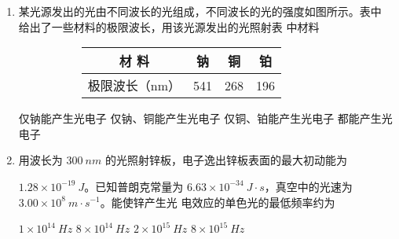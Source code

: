 \begin{enumerate}
\item 
{}
某光源发出的光由不同波长的光组成，不同波长的光的强度如图所示。表中
给出了一些材料的极限波长，用该光源发出的光照射表
中材料  
\begin{figure}[h!]
	\centering
\begin{subfigure}{0.4\linewidth}
	\centering
	 
	\caption{}\label{}
\end{subfigure}
\begin{subfigure}{0.4\linewidth}
	\centering
 \begin{tabular}{|c|c|c|c|}
	\hline 
	材  料 & 钠 & 铜 & 铂
 \\
	\hline
	极限波长（nm） & 541 & 268 & 196\\ 
	\hline 
\end{tabular}
	\caption{}\label{}
\end{subfigure}
\end{figure}


\fourchoices
{仅钠能产生光电子}
{仅钠、铜能产生光电子}
{仅铜、铂能产生光电子}
{都能产生光电子}




\item 
{}
用波长为 $ 300 \ nm $ 的光照射锌板，电子逸出锌板表面的最大初动能为


$ 1.28 \times 10^{-19} \ J $。已知普朗克常量为 $ 6.63 \times 10^{-34} \ J \cdot s $，真空中的光速为 $ 3.00 \times 10^{8} \ m \cdot s^{-1} $。能使锌产生光
电效应的单色光的最低频率约为  

\fourchoices
{$ 1 \times 10^{14} \ Hz $}
{$ 8 \times 10^{14} \ Hz $}
{$ 2 \times 10^{15} \ Hz $}
{$ 8 \times 10^{15} \ Hz $}








	
	
	
\end{enumerate}



